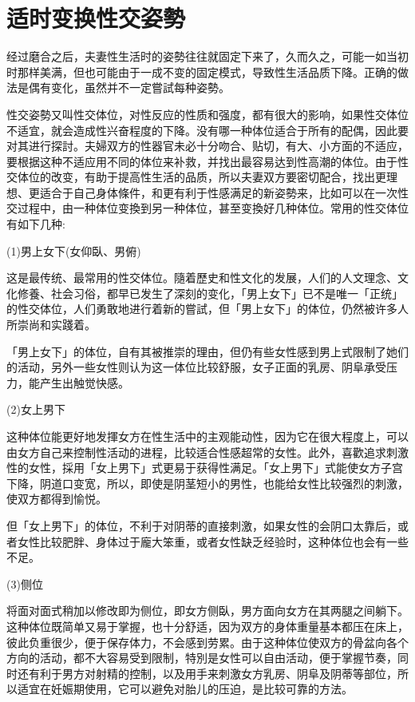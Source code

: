 \documentclass[12pt,UTF8]{ctexbook}
\begin{document}
\section{适时变换性交姿勢}

经过磨合之后，夫妻性生活时的姿勢往往就固定下来了，久而久之，可能一如当初时那样美满，但也可能由于一成不变的固定模式，导致性生活品质下降。正确的做法是偶有变化，虽然并不一定嘗試每种姿勢。

性交姿勢又叫性交体位，对性反应的性质和强度，都有很大的影响，如果性交体位不适宜，就会造成性兴奋程度的下降。没有哪一种体位适合于所有的配偶，因此要对其进行探討。夫婦双方的性器官未必十分吻合、贴切，有大、小方面的不适应，要根据这种不适应用不同的体位来补救，并找出最容易达到性高潮的体位。由于性交体位的改变，有助于提高性生活的品质，所以夫妻双方要密切配合，找出更理想、更适合于自己身体條件，和更有利于性感满足的新姿勢来，比如可以在一次性交过程中，由一种体位变換到另一种体位，甚至变換好几种体位。常用的性交体位有如下几种:

(1)男上女下(女仰臥、男俯)

这是最传统、最常用的性交体位。隨着歷史和性文化的发展，人们的人文理念、文化修養、社会习俗，都早已发生了深刻的变化，「男上女下」已不是唯一「正统」的性交体位，人们勇敢地进行着新的嘗試，但「男上女下」的体位，仍然被许多人所崇尚和实踐着。

「男上女下」的体位，自有其被推崇的理由，但仍有些女性感到男上式限制了她们的活动，另外一些女性则认为这一体位比较舒服，女子正面的乳房、阴阜承受压力，能产生出触觉快感。

(2)女上男下

这种体位能更好地发揮女方在性生活中的主观能动性，因为它在很大程度上，可以由女方自己来控制性活动的进程，比较适合性感超常的女性。此外，喜歡追求刺激性的女性，採用「女上男下」式更易于获得性满足。「女上男下」式能使女方子宫下降，阴道口变宽，所以，即使是阴茎短小的男性，也能给女性比较强烈的刺激，使双方都得到愉悦。

但「女上男下」的体位，不利于对阴蒂的直接刺激，如果女性的会阴口太靠后，或者女性比较肥胖、身体过于龐大笨重，或者女性缺乏经验时，这种体位也会有一些不足。

(3)侧位

将面对面式稍加以修改即为侧位，即女方侧臥，男方面向女方在其两腿之间躺下。这种体位既简单又易于掌握，也十分舒适，因为双方的身体重量基本都压在床上，彼此负重很少，便于保存体力，不会感到劳累。由于这种体位使双方的骨盆向各个方向的活动，都不大容易受到限制，特別是女性可以自由活动，便于掌握节奏，同时还有利于男方对射精的控制，以及用手来刺激女方乳房、阴阜及阴蒂等部位，所以适宜在妊娠期使用，它可以避免对胎儿的压迫，是比较可靠的方法。
\end{document}
